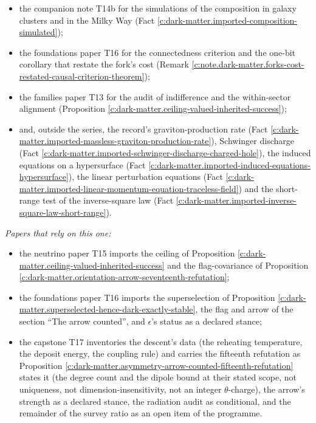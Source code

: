 \documentclass[11pt]{article}
\theoremstyle{definition}
\theoremstyle{plain}
\begin{document}
\begin{itemize}
\item the companion note T14b \cite{ButlerT14b} for the simulations of the composition in galaxy clusters and in the Milky Way (Fact \ref{c:dark-matter.imported-composition-simulated});
\item the foundations paper T16 \cite{ButlerT16} for the connectedness criterion and the one-bit corollary that restate the fork's cost (Remark \ref{c:note.dark-matter.forks-cost-restated-causal-criterion-theorem});
\item the families paper T13 \cite{ButlerT13} for the audit of indifference and the within-sector alignment (Proposition \ref{c:dark-matter.ceiling-valued-inherited-success});
\item and, outside the series, the record's graviton-production rate (Fact \ref{c:dark-matter.imported-massless-graviton-production-rate}), Schwinger discharge (Fact \ref{c:dark-matter.imported-schwinger-discharge-charged-hole}), the induced equations on a hypersurface (Fact \ref{c:dark-matter.imported-induced-equations-hypersurface}), the linear perturbation equations (Fact \ref{c:dark-matter.imported-linear-momentum-equation-traceless-field}) and the short-range test of the inverse-square law (Fact \ref{c:dark-matter.imported-inverse-square-law-short-range}).
\end{itemize}

\emph{Papers that rely on this one:}
\begin{itemize} 
\item the neutrino paper T15 \cite{ButlerT15} imports the ceiling of Proposition \ref{c:dark-matter.ceiling-valued-inherited-success} and the flag-covariance of Proposition \ref{c:dark-matter.orientation-arrow-seventeenth-refutation};
\item the foundations paper T16 \cite{ButlerT16} imports the superselection of Proposition \ref{c:dark-matter.superselected-hence-dark-exactly-stable}, the flag and arrow of the section ``The arrow counted'', and $\epsilon$'s status as a declared stance;
\item the capstone T17 \cite{ButlerT17} inventories the descent's data (the reheating temperature, the deposit energy, the coupling rule) and carries the fifteenth refutation as Proposition \ref{c:dark-matter.asymmetry-arrow-counted-fifteenth-refutation} states it (the degree count and the dipole bound at their stated scope, not uniqueness, not dimension-insensitivity, not an integer $\theta$-charge), the arrow's strength as a declared stance, the radiation audit as conditional, and the remainder of the survey ratio as an open item of the programme.
\end{itemize}
\end{document}
